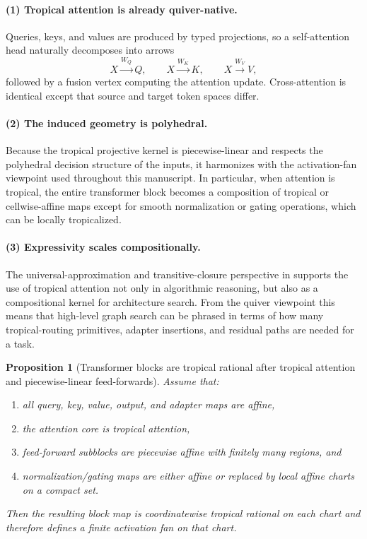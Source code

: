 \documentclass[11pt]{article}
\theoremstyle{definition}
\theoremstyle{plain}
\newtheorem{proposition}{Proposition}[section]
\theoremstyle{remark}
\begin{document}
\paragraph{(1) Tropical attention is already quiver-native.}
Queries, keys, and values are produced by typed projections, so a self-attention head naturally decomposes into arrows
\[
X \xrightarrow{W_Q} Q,\qquad
X \xrightarrow{W_K} K,\qquad
X \xrightarrow{W_V} V,
\]
followed by a fusion vertex computing the attention update.
Cross-attention is identical except that source and target token spaces differ.

\paragraph{(2) The induced geometry is polyhedral.}
Because the tropical projective kernel is piecewise-linear and respects the polyhedral decision structure of the inputs, it harmonizes with the activation-fan viewpoint used throughout this manuscript.
In particular, when attention is tropical, the entire transformer block becomes a composition of tropical or cellwise-affine maps except for smooth normalization or gating operations, which can be locally tropicalized.

\paragraph{(3) Expressivity scales compositionally.}
The universal-approximation and transitive-closure perspective in \cite{HashemiPasqueTeskaYoshida2025} supports the use of tropical attention not only in algorithmic reasoning, but also as a compositional kernel for architecture search.
From the quiver viewpoint this means that high-level graph search can be phrased in terms of how many tropical-routing primitives, adapter insertions, and residual paths are needed for a task.

\begin{proposition}[Transformer blocks are tropical rational after tropical attention and piecewise-linear feed-forwards]
\label{prop:transformer-tropical}
Assume that:
\begin{enumerate}[leftmargin=2em]
\item all query, key, value, output, and adapter maps are affine,
\item the attention core is tropical attention,
\item feed-forward subblocks are piecewise affine with finitely many regions, and
\item normalization/gating maps are either affine or replaced by local affine charts on a compact set.
\end{enumerate}
Then the resulting block map is coordinatewise tropical rational on each chart and therefore defines a finite activation fan on that chart.
\end{proposition}
\end{document}
